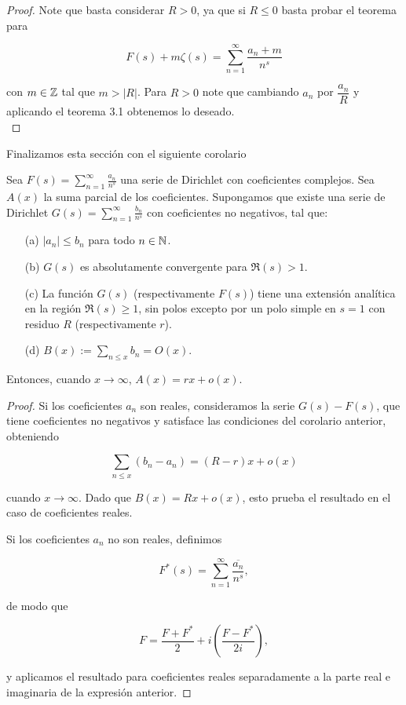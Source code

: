 \begin{proof}
    Note que basta considerar $R> 0$, ya que si $R\leq 0$ basta probar el teorema para 

    $$F(s)+m\zeta(s)=\sum_{n=1}^{\infty} \frac{a_n+m}{n^s}$$

    con $m\in \mathbb{Z}$ tal que $m>|R|$. Para $R>0$ note que cambiando $a_n$ por $\dfrac{a_n}{R}$ y aplicando el teorema 3.1 obtenemos lo deseado.\\
\end{proof}

Finalizamos esta sección con el siguiente corolario

\begin{corollary}
Sea $
F(s) =\displaystyle \sum_{n=1}^{\infty} \frac{a_n}{n^s}
$ una serie de Dirichlet con coeficientes complejos. Sea $A(x)$ la suma parcial de los coeficientes. Supongamos que existe una serie de Dirichlet $
G(s) = \displaystyle\sum_{n=1}^{\infty} \frac{b_n}{n^s}
$ con coeficientes no negativos, tal que:  

\begin{itemize}
    \item[(a)] $\left|a_n\right| \leq b_n$ para todo $n\in \mathbb{N}$.
    \item[(b)] $G(s)$ es absolutamente convergente para $\Re(s) > 1$.
    \item[(c)] La función $G(s)$ (respectivamente $F(s)$) tiene una extensión analítica en la región $\Re(s) \geq 1$, sin polos excepto por un polo simple en $s = 1$ con residuo $R$ (respectivamente $r$).
    \item[(d)] $B(x):=\displaystyle\sum_{n \leq x}b_n=O(x)$.
\end{itemize}

Entonces, cuando $x \rightarrow \infty$, $
A(x) = r x + o(x).
$
\end{corollary}


\begin{proof}
Si los coeficientes $a_n$ son reales, consideramos la serie $G(s)-F(s)$, que tiene coeficientes no negativos y satisface las condiciones del corolario anterior, obteniendo

$$
\sum_{n \leq x}\left(b_n-a_n\right) = (R-r) x + o(x)
$$

cuando $x \to \infty$. Dado que $B(x) = R x + o(x)$, esto prueba el resultado en el caso de coeficientes reales.  

Si los coeficientes $a_n$ no son reales, definimos

$$
F^*(s) = \sum_{n=1}^{\infty} \frac{\overline{a_n}}{n^s},
$$

de modo que

$$
F = \frac{F + F^*}{2} + i\left(\frac{F - F^*}{2 i}\right),
$$

y aplicamos el resultado para coeficientes reales separadamente a la parte real e imaginaria de la expresión anterior.
\end{proof}


